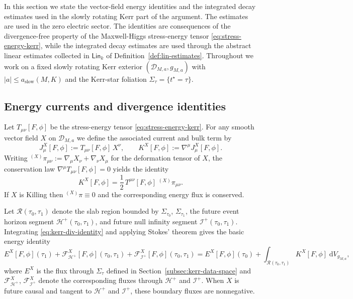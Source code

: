 \documentclass[11pt]{article}
\numberwithin{equation}{section}
\theoremstyle{plain}
\theoremstyle{definition}
\theoremstyle{remark}
\newcommand{\dd}{\mathrm{d}}
\newcommand{\Lin}{\mathsf{Lin}}
\begin{document}
In this section we state the vector-field energy identities and the integrated decay estimates used in the slowly rotating Kerr part of the argument.  The estimates are used in the zero electric sector.  The identities are consequences of the divergence-free property of the Maxwell-Higgs stress-energy tensor \eqref{eq:stress-energy-kerr}, while the integrated decay estimates are used through the abstract linear estimates collected in $\Lin_{k}$ of Definition~\ref{def:lin-estimates}.
Throughout we work on a fixed slowly rotating Kerr exterior $(\mathcal D_{M,a},g_{M,a})$ with $|a|\le a_{\mathrm{slow}}(M,K)$ and the Kerr-star foliation $\Sigma_{\tau}=\{t^{\star}=\tau\}$.

\subsection{Energy currents and divergence identities}\label{subsec:kerr-energy-identities}

Let $T_{\mu\nu}[F,\phi]$ be the stress-energy tensor \eqref{eq:stress-energy-kerr}.
For any smooth vector field $X$ on $\mathcal D_{M,a}$ we define the associated current and bulk term by
\begin{equation}\label{eq:kerr-energy-current}
J^{X}_{\mu}[F,\phi]:=T_{\mu\nu}[F,\phi]\,X^{\nu},
\qquad
K^{X}[F,\phi]:=\nabla^{\mu}J^{X}_{\mu}[F,\phi].
\end{equation}
Writing ${}^{(X)}\pi_{\mu\nu}:=\nabla_{\mu}X_{\nu}+\nabla_{\nu}X_{\mu}$ for the deformation tensor of $X$, the conservation law $\nabla^{\mu}T_{\mu\nu}[F,\phi]=0$ yields the identity
\begin{equation}\label{eq:kerr-div-identity}
K^{X}[F,\phi]
=
\frac12\,T^{\mu\nu}[F,\phi]\;{}^{(X)}\pi_{\mu\nu}.
\end{equation}
If $X$ is Killing then ${}^{(X)}\pi\equiv0$ and the corresponding energy flux is conserved.

Let $\mathcal R(\tau_{0},\tau_{1})$ denote the slab region bounded by $\Sigma_{\tau_{0}}$, $\Sigma_{\tau_{1}}$, the future event horizon segment $\mathcal H^{+}(\tau_{0},\tau_{1})$, and future null infinity segment $\mathcal I^{+}(\tau_{0},\tau_{1})$.
Integrating \eqref{eq:kerr-div-identity} and applying Stokes' theorem gives the basic energy identity
\begin{equation}\label{eq:kerr-energy-identity}
E^{X}[F,\phi](\tau_{1})
+\mathcal F^{X}_{\mathcal H^{+}}[F,\phi](\tau_{0},\tau_{1})
+\mathcal F^{X}_{\mathcal I^{+}}[F,\phi](\tau_{0},\tau_{1})
=
E^{X}[F,\phi](\tau_{0})
+\int_{\mathcal R(\tau_{0},\tau_{1})} K^{X}[F,\phi]\;\dd V_{g_{M,a}},
\end{equation}
where $E^{X}$ is the flux through $\Sigma_{\tau}$ defined in Section~\ref{subsec:kerr-data-space} and $\mathcal F^{X}_{\mathcal H^{+}}$, $\mathcal F^{X}_{\mathcal I^{+}}$ denote the corresponding fluxes through $\mathcal H^{+}$ and $\mathcal I^{+}$.
When $X$ is future causal and tangent to $\mathcal H^{+}$ and $\mathcal I^{+}$, these boundary fluxes are nonnegative.
\end{document}
